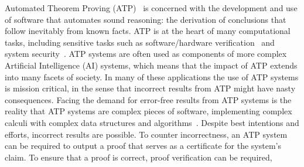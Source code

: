 \documentclass[runningheads]{llncs}
\newcommand{\smalltt}[1]{\small \texttt{#1}}
\begin{document}
Automated Theorem Proving (ATP)~\cite{RV01-HAR} is concerned with the development and use of 
software that automates sound reasoning: the derivation of conclusions that follow inevitably 
from known facts.
ATP is at the heart of many computational tasks, including sensitive tasks such as 
software/hardware verification~\cite{HH19} and system security~\cite{Coo18}.
ATP systems are often used as components of more complex Artificial Intelligence (AI) systems,
which means that the impact of ATP extends into many facets of society.
In many of these applications the use of ATP systems is mission critical, in the sense that 
incorrect results from ATP might have nasty consequences.
Facing the demand for error-free results from ATP systems is the reality that ATP systems
are complex pieces of software, implementing complex calculi with complex data structures and
algorithms~\cite{Sch06}. 
Despite best intentions and efforts, incorrect results are possible.
To counter incorrectness, an ATP system can be required to output a proof
that serves as a certificate for the system's claim.
To ensure that a 
proof is correct, proof verification can be required, 
\end{document}
